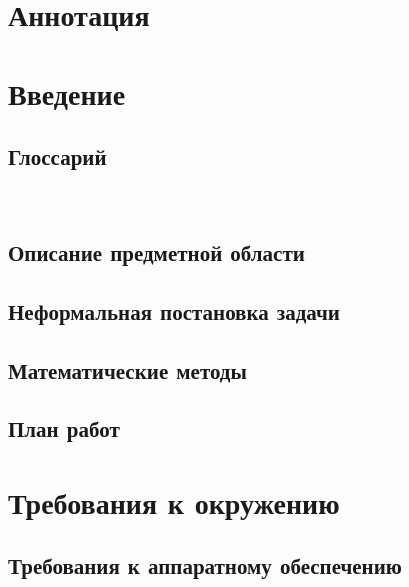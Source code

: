 \documentclass{fefu}
\author{Сластен Т.Д.}
\begin{document}
  \makereporttitle

  \tableofcontents
  \pagebreak

  \section*{Аннотация}
  
  \pagebreak

  \section{Введение}
  \subsection{Глоссарий}
  \
  \subsection{Описание предметной области}
  
  \subsection{Неформальная постановка задачи}
  
  \subsection{Математические методы}
  
  \subsection{План работ}
  

  \section{Требования к окружению}
  \subsection{Требования к аппаратному обеспечению}
  
\end{document}
